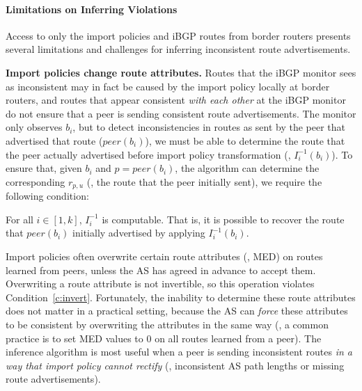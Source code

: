 
\paragraph{Limitations on Inferring Violations}\label{sec:limit}

Access to only the import policies and iBGP routes from border routers
presents several limitations and challenges for inferring 
inconsistent route advertisements.  

{\bf Import policies change route attributes.} 
Routes that the iBGP monitor sees as inconsistent may in fact be
  caused by the import policy locally at border routers, and routes
  that appear consistent {\em with each other} at the iBGP monitor do
  not ensure that a peer is sending consistent route advertisements.
  The monitor only
  observes $b_i$, but to detect inconsistencies in routes as sent by
  the peer that advertised that route ($peer(b_i)$), we must be able
  to determine the route that the peer actually advertised before
  import policy transformation (\ie, $I_i^{-1}(b_i)$). To ensure
  that, given $b_i$ and $p = peer(b_i)$, the algorithm can determine
  the corresponding $r_{p,u}$ (\ie, the route that the peer initially
  sent), we require the following condition:

\begin{constraint}\label{c:invert}
For all $i \in [1,k]$, $I^{-1}_i$ is computable.  That is, it is
possible to recover the route that $peer(b_i)$ initially advertised by
applying $I^{-1}_{i}(b_i)$.
\end{constraint}

Import policies often overwrite certain route attributes (\eg, MED) on
routes learned from peers, unless the AS has agreed in advance to accept
them.  Overwriting a route attribute is not invertible, so this
operation violates Condition~\ref{c:invert}.  Fortunately, the inability
to determine these route attributes does not matter in a practical
setting, because the AS can {\em force\/} these attributes to be
consistent by overwriting the attributes in the same way (\eg, a common
practice is to set MED values to $0$ on all routes learned from a peer).
The inference algorithm is most useful when a peer is sending
inconsistent routes {\em in a way that import policy cannot rectify}
(\eg, inconsistent AS path lengths or missing route advertisements).


